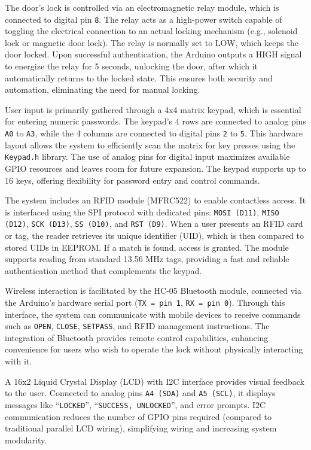 \documentclass[conference, onecolumn]{IEEEtran}
\begin{document}
The door's lock is controlled via an electromagnetic relay module, which is connected to digital pin \texttt{8}. The relay acts as a high-power switch capable of toggling the electrical connection to an actual locking mechanism (e.g., solenoid lock or magnetic door lock). The relay is normally set to LOW, which keeps the door locked. Upon successful authentication, the Arduino outputs a HIGH signal to energize the relay for 5 seconds, unlocking the door, after which it automatically returns to the locked state. This ensures both security and automation, eliminating the need for manual locking.

User input is primarily gathered through a 4x4 matrix keypad, which is essential for entering numeric passwords. The keypad's 4 rows are connected to analog pins \texttt{A0} to \texttt{A3}, while the 4 columns are connected to digital pins \texttt{2} to \texttt{5}. This hardware layout allows the system to efficiently scan the matrix for key presses using the \texttt{Keypad.h} library. The use of analog pins for digital input maximizes available GPIO resources and leaves room for future expansion. The keypad supports up to 16 keys, offering flexibility for password entry and control commands.

The system includes an RFID module (MFRC522) to enable contactless access. It is interfaced using the SPI protocol with dedicated pins: \texttt{MOSI (D11)}, \texttt{MISO (D12)}, \texttt{SCK (D13)}, \texttt{SS (D10)}, and \texttt{RST (D9)}. When a user presents an RFID card or tag, the reader retrieves its unique identifier (UID), which is then compared to stored UIDs in EEPROM. If a match is found, access is granted. The module supports reading from standard 13.56 MHz tags, providing a fast and reliable authentication method that complements the keypad.

Wireless interaction is facilitated by the HC-05 Bluetooth module, connected via the Arduino’s hardware serial port (\texttt{TX = pin 1}, \texttt{RX = pin 0}). Through this interface, the system can communicate with mobile devices to receive commands such as \texttt{OPEN}, \texttt{CLOSE}, \texttt{SETPASS}, and RFID management instructions. The integration of Bluetooth provides remote control capabilities, enhancing convenience for users who wish to operate the lock without physically interacting with it.

A 16x2 Liquid Crystal Display (LCD) with I2C interface provides visual feedback to the user. Connected to analog pins \texttt{A4 (SDA)} and \texttt{A5 (SCL)}, it displays messages like “\texttt{LOCKED}”, “\texttt{SUCCESS, UNLOCKED}”, and error prompts. I2C communication reduces the number of GPIO pins required (compared to traditional parallel LCD wiring), simplifying wiring and increasing system modularity.
\end{document}

